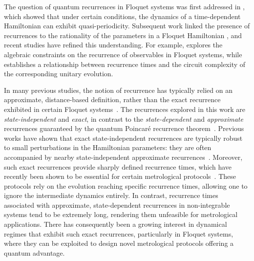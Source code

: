 \documentclass[a4paper,onecolumn,accepted=2026-04-08,10pt]{quantumarticle}
\theoremstyle{definition}
\begin{document}
The question of quantum recurrences in Floquet systems was first addressed in \cite{hogg_1982_recurrence}, which showed that under certain conditions, the dynamics of a time-dependent Hamiltonian can exhibit quasi-periodicity. Subsequent work linked the presence of recurrences to the rationality of the parameters in a Floquet Hamiltonian \cite{fishman_rotor_anderson_1982}, and recent studies have refined this understanding. For example, \cite{pandit_2022_bounds} explores the algebraic constraints on the recurrence of observables in Floquet systems, while \cite{oszmaniec_2024_saturation} establishes a relationship between recurrence times and the circuit complexity of the corresponding unitary evolution.

In many previous studies, the notion of recurrence has typically relied on an approximate, distance-based definition, rather than the exact recurrence exhibited in certain Floquet systems~\cite{khemani_2019_a, anand_davis_ghose_2024}. The recurrences explored in this work are \textit{state-independent} and \textit{exact}, in contrast to the \textit{state-dependent} and \textit{approximate} recurrences guaranteed by the quantum Poincaré recurrence theorem~\cite{bocchieri_1957_quantum}. Previous works have shown that exact state-independent recurrences are typically robust to small perturbations in the Hamiltonian parameters: they are often accompanied by nearby state-independent approximate recurrences~\cite{sayan_time_crystal_2020,Zou_Wang_pseudo_2022, anand_davis_ghose_2024}. Moreover, such exact recurrences provide sharply defined recurrence times, which have recently been shown to be essential for certain metrological protocols~\cite{zou_2025_enhancing,biswas_2025_the}. These protocols rely on the evolution reaching specific recurrence times, allowing one to ignore the intermediate dynamics entirely. In contrast, recurrence times associated with approximate, state-dependent recurrences in non-integrable systems tend to be extremely long, rendering them unfeasible for metrological applications. There has consequently been a growing interest in dynamical regimes that exhibit such exact recurrences, particularly in Floquet systems, where they can be exploited to design novel metrological protocols offering a quantum advantage.
\end{document}
